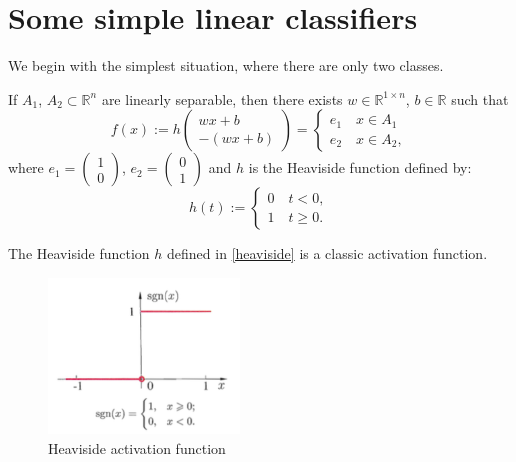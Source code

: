 \newpage
\section{Some simple linear classifiers}
We begin with the simplest situation, where there are only two classes.
\begin{lemma}
If $A_1$, $A_2\subset\mathbb{R}^n$ are linearly separable, then there exists $w\in\mathbb{R}^{1\times n}$, $b\in\mathbb{R}$ such that
        \begin{equation}
          f(x):=h\left( \begin{array}{cc}
              wx+b \\
              -(wx+b)
            \end{array}
          \right)
          =
          \begin{cases}
            e_1 \quad x\in A_1 \\
            e_2 \quad x\in A_2,
          \end{cases}
        \end{equation}
      where $e_1=\left( \begin{array}{cc} 1\\0 \end{array} \right)$,
      $e_2=\left( \begin{array}{cc} 0\\1 \end{array} \right)$ and
        $h$ is the Heaviside function defined by:
        \begin{equation}
        \label{heaviside}
        h(t):=\begin{cases}
        0 \quad t < 0, \\
        1 \quad t \ge 0 .
        \end{cases}
        \end{equation}
      \end{lemma}
      The Heaviside function $h$ defined in \eqref{heaviside} is a
      classic activation function. 
      \begin{figure}
      	\centering
      	\includegraphics[width=2in]{figures/Heaviside.png}   
      	\caption{Heaviside activation function }
      \end{figure}
      
